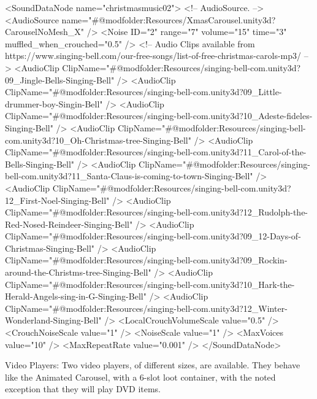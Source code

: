 \begin{DoxyVerb}
<SoundDataNode name="christmasmusic02">
    <!-- AudioSource.  -->
    <AudioSource name="#@modfolder:Resources/XmasCarousel.unity3d?CarouselNoMesh_X" />
    <Noise ID="2" range="7" volume="15" time="3" muffled_when_crouched="0.5" />
    <!-- Audio Clips available from https://www.singing-bell.com/our-free-songs/list-of-free-christmas-carols-mp3/ -->
    <AudioClip ClipName="#@modfolder:Resources/singing-bell-com.unity3d?09_Jingle-Bells-Singing-Bell" />
    <AudioClip ClipName="#@modfolder:Resources/singing-bell-com.unity3d?09_Little-drummer-boy-Singin-Bell" />
    <AudioClip ClipName="#@modfolder:Resources/singing-bell-com.unity3d?10_Adeste-fideles-Singing-Bell" />
    <AudioClip ClipName="#@modfolder:Resources/singing-bell-com.unity3d?10_Oh-Christmas-tree-Singing-Bell" />
    <AudioClip ClipName="#@modfolder:Resources/singing-bell-com.unity3d?11_Carol-of-the-Bells-Singing-Bell" />
    <AudioClip ClipName="#@modfolder:Resources/singing-bell-com.unity3d?11_Santa-Claus-is-coming-to-town-Singing-Bell" />
    <AudioClip ClipName="#@modfolder:Resources/singing-bell-com.unity3d?12_First-Noel-Singing-Bell" />
    <AudioClip ClipName="#@modfolder:Resources/singing-bell-com.unity3d?12_Rudolph-the-Red-Nosed-Reindeer-Singing-Bell" />
    <AudioClip ClipName="#@modfolder:Resources/singing-bell-com.unity3d?09_12-Days-of-Christmas-Singing-Bell" />
    <AudioClip ClipName="#@modfolder:Resources/singing-bell-com.unity3d?09_Rockin-around-the-Christms-tree-Singing-Bell" />
    <AudioClip ClipName="#@modfolder:Resources/singing-bell-com.unity3d?10_Hark-the-Herald-Angels-sing-in-G-Singing-Bell" />
    <AudioClip ClipName="#@modfolder:Resources/singing-bell-com.unity3d?12_Winter-Wonderland-Singing-Bell" />
    <LocalCrouchVolumeScale value="0.5" />
    <CrouchNoiseScale value="1" />
    <NoiseScale value="1" />
    <MaxVoices value="10" />
    <MaxRepeatRate value="0.001" />
</SoundDataNode>
\end{DoxyVerb}


Video Players\+: Two video players, of different sizes, are available. They behave like the Animated Carousel, with a 6-\/slot loot container, with the noted exception that they will play D\+VD items.

